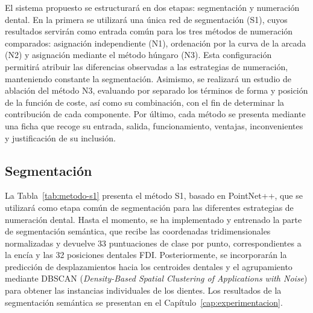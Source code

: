 El sistema propuesto se estructurará en dos etapas: segmentación y numeración dental. En la primera se utilizará una única red de segmentación (S1), cuyos resultados servirán como entrada común para los tres métodos de numeración comparados: asignación independiente (N1), ordenación por la curva de la arcada (N2) y asignación mediante el método húngaro (N3). Esta configuración permitirá atribuir las diferencias observadas a las estrategias de numeración, manteniendo constante la segmentación. Asimismo, se realizará un estudio de ablación del método N3, evaluando por separado los términos de forma y posición de la función de coste, así como su combinación, con el fin de determinar la contribución de cada componente. Por último, cada método se presenta mediante una ficha que recoge su entrada, salida, funcionamiento, ventajas, inconvenientes y justificación de su inclusión.

\subsection{Segmentación}
\label{subsec:metodo-segmentacion}

La Tabla~\ref{tab:metodo-s1} presenta el método S1, basado en PointNet++, que se utilizará como etapa común de segmentación para las diferentes estrategias de numeración dental. Hasta el momento, se ha implementado y entrenado la parte de segmentación semántica, que recibe las coordenadas tridimensionales normalizadas y devuelve 33 puntuaciones de clase por punto, correspondientes a la encía y las 32 posiciones dentales FDI. Posteriormente, se incorporarán la predicción de desplazamientos hacia los centroides dentales y el agrupamiento mediante DBSCAN (\textit{Density-Based Spatial Clustering of Applications with Noise}) para obtener las instancias individuales de los dientes. Los resultados de la segmentación semántica se presentan en el Capítulo~\ref{cap:experimentacion}.

